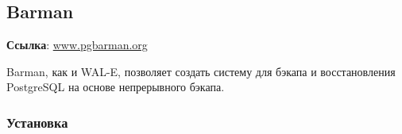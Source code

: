 \subsection{Barman}
\textbf{Ссылка}: \href{http://www.pgbarman.org/}{www.pgbarman.org}

Barman, как и WAL-E, позволяет создать систему для бэкапа и восстановления PostgreSQL на основе непрерывного бэкапа.

\subsubsection{Установка}

